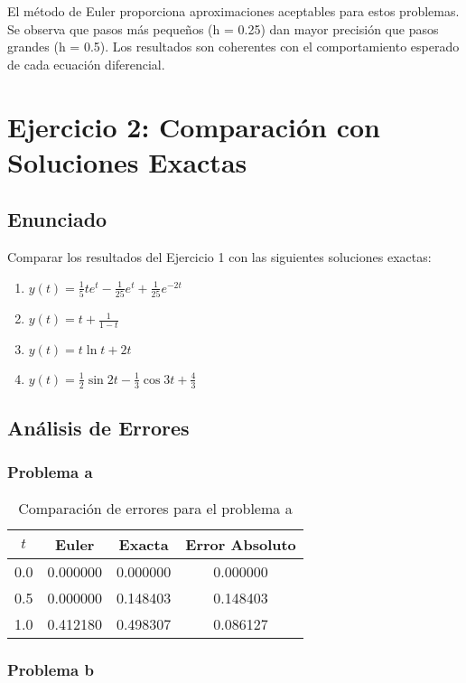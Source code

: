 \documentclass[12pt,a4paper]{article}
\begin{document}
El método de Euler proporciona aproximaciones aceptables para estos problemas. Se observa que pasos más pequeños (h = 0.25) dan mayor precisión que pasos grandes (h = 0.5). Los resultados son coherentes con el comportamiento esperado de cada ecuación diferencial.

\section{Ejercicio 2: Comparación con Soluciones Exactas}

\subsection{Enunciado}

Comparar los resultados del Ejercicio 1 con las siguientes soluciones exactas:

\begin{enumerate}
    \item $y(t) = \frac{1}{5}te^t - \frac{1}{25}e^t + \frac{1}{25}e^{-2t}$
    \item $y(t) = t + \frac{1}{1-t}$
    \item $y(t) = t \ln t + 2t$
    \item $y(t) = \frac{1}{2}\sin 2t - \frac{1}{3}\cos 3t + \frac{4}{3}$
\end{enumerate}

\subsection{Análisis de Errores}

\subsubsection{Problema a}

\begin{table}[H]
\centering
\begin{tabular}{cccc}
\toprule
$t$ & Euler & Exacta & Error Absoluto \\
\midrule
0.0 & 0.000000 & 0.000000 & 0.000000 \\
0.5 & 0.000000 & 0.148403 & 0.148403 \\
1.0 & 0.412180 & 0.498307 & 0.086127 \\
\bottomrule
\end{tabular}
\caption{Comparación de errores para el problema a}
\end{table}

\subsubsection{Problema b}
\end{document}
